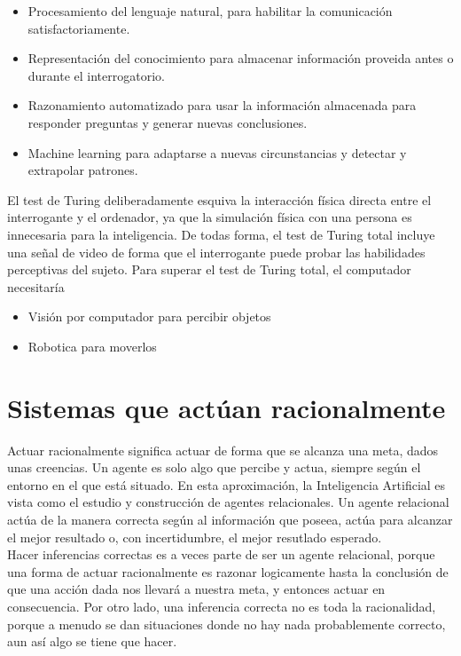 \documentclass{article}
\begin{document}
\begin{itemize}
\item Procesamiento del lenguaje natural, para habilitar la comunicación satisfactoriamente.

\item Representación del conocimiento para almacenar información proveida antes o durante el interrogatorio.

\item Razonamiento automatizado para usar la información almacenada para responder preguntas y generar nuevas conclusiones.

\item Machine learning para adaptarse a nuevas circunstancias y detectar y extrapolar patrones.
\end{itemize}

El test de Turing deliberadamente esquiva la interacción física directa entre el interrogante y el ordenador, ya que la simulación física con una persona es innecesaria para la inteligencia. De todas forma, el test de Turing total incluye una señal de video de forma que el interrogante puede probar las habilidades perceptivas del sujeto. Para superar el test de Turing total, el computador necesitaría

\begin{itemize}
\item Visión por computador para percibir objetos

\item Robotica para moverlos
\end{itemize}

\section{Sistemas que actúan racionalmente}
Actuar racionalmente significa actuar de forma que se alcanza una meta, dados unas creencias. Un agente es solo algo que percibe y actua, siempre según el entorno en el que está situado. En esta aproximación, la Inteligencia Artificial es vista como el estudio y construcción de agentes relacionales. Un agente relacional actúa de la manera correcta según al información que poseea, actúa para alcanzar el mejor resultado o, con incertidumbre, el mejor resutlado esperado. \\

Hacer inferencias correctas es a veces parte de ser un agente relacional, porque una forma de actuar racionalmente es razonar logicamente hasta la conclusión de que una acción dada nos llevará a nuestra meta, y entonces actuar en consecuencia. Por otro lado, una inferencia correcta no es toda la racionalidad, porque a menudo se dan situaciones donde no hay nada probablemente correcto, aun así algo se tiene que hacer. \\
\end{document}
